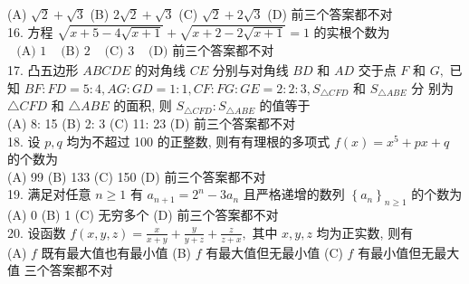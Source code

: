 (A) $\sqrt{2}+\sqrt{3}$
(B) $2 \sqrt{2}+\sqrt{3}$
(C) $\sqrt{2}+2 \sqrt{3}$
(D) 前三个答案都不对\\
16. 方程 $\sqrt{x+5-4 \sqrt{x+1}}+\sqrt{x+2-2 \sqrt{x+1}}=1$ 的实根个数为\\
$\begin{array}{lll}\text { (A) } 1 & \text { (B) } 2 & \text { (C) } 3 & \text { (D) 前三个答案都不对 }\end{array}$\\
17. 凸五边形 $A B C D E$ 的对角线 $C E$ 分别与对角线 $B D$ 和 $A D$ 交于点 $F$ 和 $G,$ 已知 $B F: F D=5: 4, A G: G D=1: 1, C F: F G: G E=2: 2: 3, S_{\triangle C F D}$ 和 $S_{\triangle A B E}$ 分
别为 $\triangle C F D$ 和 $\triangle A B E$ 的面积, 则 $S_{\triangle C F D}: S_{\triangle A B E}$ 的值等于\\
(A) 8: 15
(B) 2: 3
(C) 11: 23
(D) 前三个答案都不对\\
18. 设 $p, q$ 均为不超过 100 的正整数, 则有有理根的多项式 $f(x)=x^{5}+p x+q$ 的个数为\\
(A) 99
(B) 133
(C) 150
(D) 前三个答案都不对\\
19. 满足对任意 $n \geq 1$ 有 $a_{n+1}=2^{n}-3 a_{n}$ 且严格递增的数列 $\left\{a_{n}\right\}_{n \geq 1}$ 的个数为\\
(A) 0
(B) 1
(C) 无穷多个
(D) 前三个答案都不对\\
20. 设函数 $f(x, y, z)=\frac{x}{x+y}+\frac{y}{y+z}+\frac{z}{z+x},$ 其中 $x, y, z$ 均为正实数, 则有\\
(A) $f$ 既有最大值也有最小值
(B) $f$ 有最大值但无最小值
(C) $f$ 有最小值但无最大值
三个答案都不对